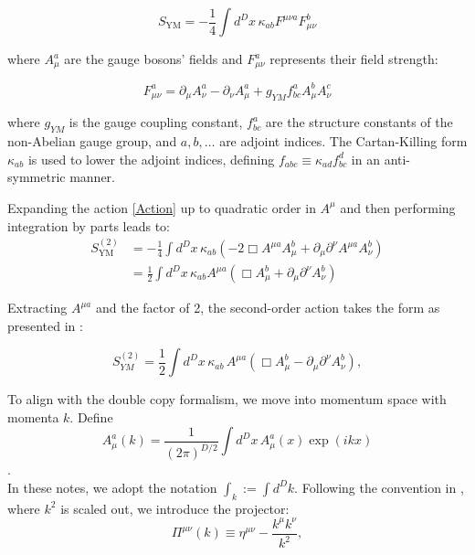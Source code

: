 \documentclass[13pt]{article}
\begin{document}
\begin{equation}
S_\text{YM} = -\frac{1}{4} \int d^Dx \, \kappa_{ab} F^{\mu \nu a} F_{\mu \nu}^{b} \tag{6}
\label{Action}
\end{equation}


where \(A_{\mu}^{a}\) are the gauge bosons' fields and \(F_{\mu \nu}^{a}\) represents their field strength:

\begin{equation}
F_{\mu \nu}^{a} = \partial_{\mu} A^{a}_{\nu} - \partial_{\nu}A^{a}_{\mu} + g_{YM} f^{a}_{bc}A_{\mu}^{b} A_{\nu}^{c} \tag{7}
\end{equation}


where \(g_{YM}\) is the gauge coupling constant, \(f^{a}_{bc}\) are the structure constants of the non-Abelian gauge group, and \(a, b, \ldots\) are adjoint indices. The Cartan-Killing form \(\kappa_{ab}\) is used to lower the adjoint indices, defining \(f_{abc} \equiv \kappa_{ad}f^d_{bc}\) in an anti-symmetric manner.

Expanding the action \eqref{Action} up to quadratic order in \(A^{\mu}\) and then performing integration by parts leads to:
\begin{align}
S_\text{YM}^{(2)} &=-\frac{1}{4} \int d^{D}x \, \kappa_{ab} \left(-2 \Box A^{\mu a} A_{\mu}^{b} + \partial_{\mu}\partial^{\nu} A^{\mu a}A_{\nu}^b\right) \nonumber \\
&=\frac{1}{2} \int d^{D}x \, \kappa_{ab}A^{\mu a} \left(\Box A_{\mu}^{b} + \partial_{\mu}\partial^{\nu} A_{\nu}^b\right)
\tag{8}
\end{align}

Extracting \(A^{\mu a}\) and the factor of 2, the second-order action takes the form as presented in \cite{D_az_Jaramillo_2022}:

\[S_{YM}^{(2)} = \frac{1}{2} \int d^{D}x \, \kappa_{ab} \, A^{\mu a}(\Box A^{b}_{\mu} - \partial_{\mu} \partial^{\nu} A^b_{\nu}), \tag{9}\]

To align with the double copy formalism, we move into momentum space with momenta \(k\). Define $$A^{a}_{\mu}(k) = \frac{1}{(2\pi)^{D/2}} \int d^D x \, A_{\mu}^{a}(x) \exp(ikx)$$. \\
In these notes, we adopt the notation \(\int_k := \int d^{D} k\). Following the convention in \cite{D_az_Jaramillo_2022}, where \(k^2\) is scaled out, we introduce the projector:
\begin{equation}
    \Pi^{\mu \nu}(k) \equiv \eta^{\mu \nu} - \frac{k^{\mu} k^{\nu}}{k^2}, \tag{10}
    \label{prop1}
\end{equation}
\end{document}
